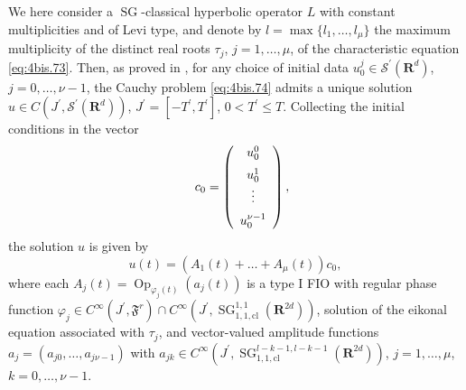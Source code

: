 \documentclass[12pt,a4paper,reqno]{amsart}
\numberwithin{equation}{section}
\numberwithin{thm}{section}
\theoremstyle{definition}
\theoremstyle{remark}
\begin{document}
\par

    We here consider a ${\operatorname{SG}}$-classical hyperbolic operator $L$ with constant multiplicities and
    of Levi type, and denote by $l = \max \{ l_{1}, \dots, l_{\mu} \}$
    the maximum multiplicity of the distinct real roots $\tau_{j}$, $j=1,\dots,\mu$, of the
    characteristic equation \eqref{eq:4bis.73}.
    Then, as proved in \cite{coriasco2,CoPa},
 for any choice of initial data $u^j_0\in{{\mathscr S}}^\prime({\mathbf R^{{d}}})$, $j=0,\dots,\nu-1$,
    the Cauchy problem \eqref{eq:4bis.74} admits a unique solution $u
    \in C(J^\prime,{{\mathscr S}}^\prime({\mathbf R^{{d}}}))$, $J^\prime=[-T^\prime,T^\prime]$,
    $0<T^\prime\le T$. Collecting the initial conditions in the vector
        \begin{eqnarray*}
	& &
	c_0 = \left(
	\begin{array}{c}
	    u_{0}^{0}
	    \\
	    u^{1}_{0}\rule{0mm}{5mm}
	    \\
	    \vdots\rule{0mm}{5mm}
	    \\
	    u^{\nu-1}_{0}\rule{0mm}{5mm}
	\end{array}
	\right),
    \end{eqnarray*}
        the solution $u$ is given by
        \[
	u(t) = (A_1(t) + \dots + A_{\mu}(t)) c_0,
    \]
        where each $A_{j}(t) = {\operatorname{Op}}_{\varphi_{j}(t)}(a_{j}(t))$
    is a type I FIO with regular phase function $\varphi_{j}
    \in C^\infty(J^\prime, {\mathfrak{F}^r})\cap C^\infty(J^\prime,{\operatorname{SG}}^{1,1}_{1,1,\mathrm{cl}}({\mathbf R^{{2d}}}))$,
    solution of the eikonal equation associated with $\tau_{j}$,
    and vector-valued amplitude functions $a_{j} = (a_{j0}, \dots, a_{j\nu-1})$
    with $a_{jk} \in
    C^\infty(J^\prime,{\operatorname{SG}}^{l-k-1,l-k-1}_{1,1,\mathrm{cl}}({\mathbf R^{{2d}}}))$,
    $j = 1, \dots, \mu$, $k=0, \dots, \nu-1$. 
\end{document}
